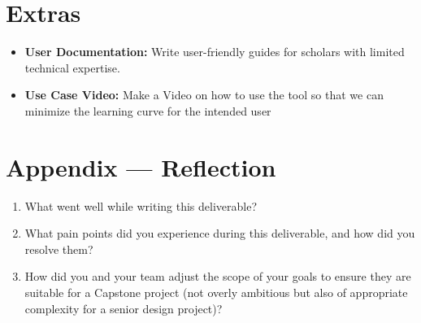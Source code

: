\documentclass{article}
\begin{document}
\section{Extras}
\begin{itemize}
  \item \textbf{User Documentation:} Write user-friendly guides for scholars with limited technical expertise.
  \item \textbf{Use Case Video:} Make a Video on how to use the tool so that we can minimize the learning curve for the intended user
\end{itemize}


\newpage{}

\section*{Appendix --- Reflection}




\begin{enumerate}
    \item What went well while writing this deliverable? 
    \item What pain points did you experience during this deliverable, and how
    did you resolve them?
    \item How did you and your team adjust the scope of your goals to ensure
    they are suitable for a Capstone project (not overly ambitious but also of
    appropriate complexity for a senior design project)?
\end{enumerate}  
\end{document}
